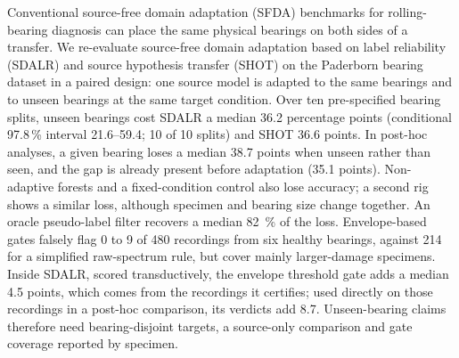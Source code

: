 Conventional source-free domain adaptation (SFDA) benchmarks for rolling-bearing diagnosis can place the same physical bearings on both sides of a transfer. We re-evaluate source-free domain adaptation based on label reliability (SDALR) and source hypothesis transfer (SHOT) on the Paderborn bearing dataset in a paired design: one source model is adapted to the same bearings and to unseen bearings at the same target condition. Over ten pre-specified bearing splits, unseen bearings cost SDALR a median 36.2 percentage points (conditional 97.8\,\% interval 21.6--59.4; 10 of 10 splits) and SHOT 36.6 points. In post-hoc analyses, a given bearing loses a median 38.7 points when unseen rather than seen, and the gap is already present before adaptation (35.1 points). Non-adaptive forests and a fixed-condition control also lose accuracy; a second rig shows a similar loss, although specimen and bearing size change together. An oracle pseudo-label filter recovers a median \SI{82}{\percent} of the loss. Envelope-based gates falsely flag 0 to 9 of 480 recordings from six healthy bearings, against 214 for a simplified raw-spectrum rule, but cover mainly larger-damage specimens. Inside SDALR, scored transductively, the envelope threshold gate adds a median 4.5 points, which comes from the recordings it certifies; used directly on those recordings in a post-hoc comparison, its verdicts add 8.7. Unseen-bearing claims therefore need bearing-disjoint targets, a source-only comparison and gate coverage reported by specimen.
